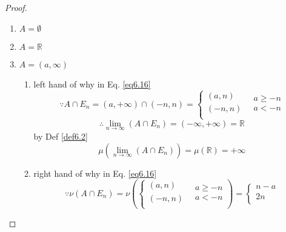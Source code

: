 \begin{proof}
	\begin{enumerate}
		\item $	A = \emptyset $
		\item $ A = \mathbb{R} $
		\item $ A = \left( {a,\infty } \right)$
		\begin{enumerate}
			\item left hand of {\color{red} why } in Eq. \ref{eq6.16}
			\begin{equation}
			\because {A \cap {E_n}} = \left( {a, + \infty } \right) \cap \left( { - n,n} \right) = \left\{ {\begin{matrix}
				{\left( {a,n} \right)}  \\ 
				{\left( { - n,n} \right)}  \\ 
				\end{matrix} } \right.\;\;\begin{matrix}
			{a \geqslant  - n}  \\ 
			{a <  - n}  \\ 
			\end{matrix} 
			\end{equation}
			\begin{equation}
			\therefore \mathop {\lim }\limits_{n \to \infty } \left( {A \cap {E_n}} \right) = \left( { - \infty , + \infty } \right) = \mathbb{R}
			\end{equation}
			by Def \ref{def6.2}
			\begin{equation}
			\mu \left( {\mathop {\lim }\limits_{n \to \infty } \left( {A \cap {E_n}} \right)} \right) = \mu \left( \mathbb{R} \right) =  + \infty 
			\end{equation}
			\item right hand of {\color{red} why } in Eq. \ref{eq6.16}
			\begin{equation}
			\because \nu \left( {A \cap {E_n}} \right) = \nu \left( {\left\{ {\begin{matrix}
					{\left( {a,n} \right)}  \\ 
					{\left( { - n,n} \right)}  \\ 
					
					\end{matrix} \;\;\begin{matrix}
					{a \geqslant  - n}  \\ 
					{a <  - n}  \\ 
					
					\end{matrix} } \right.} \right) = \left\{ {\begin{matrix}
				{n - a}  \\ 
				{2n}  \\ 
				

\end{matrix}}
\end{equation}
\end{enumerate}
\end{enumerate}
\end{proof}

